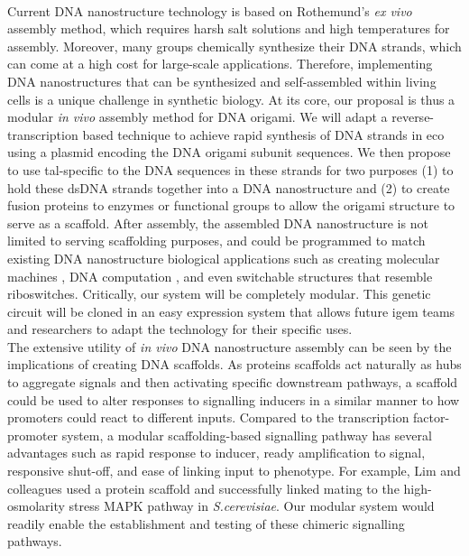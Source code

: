 \documentclass[a4paper]{article}
\begin{document}
\\
Current DNA nanostructure technology is based on Rothemund’s \textit{ex vivo} assembly method, which requires harsh salt solutions and high temperatures for assembly\cite{intro4}.
Moreover, many groups chemically synthesize their DNA strands, which can come at a high cost for large-scale applications.
Therefore, implementing DNA nanostructures that can be synthesized and self-assembled within living cells is a unique challenge in synthetic biology.
At its core, our proposal is thus a modular \textit{in vivo} assembly method for DNA origami.
We will adapt a reverse-transcription based technique to achieve rapid synthesis of DNA strands in \ac{eco} using a plasmid encoding the DNA origami subunit sequences\cite{intro5}.
We then propose to use \ac{tal}-specific to the DNA sequences in these strands for two purposes (1) to hold these dsDNA strands together into a DNA nanostructure and (2) to create fusion proteins to enzymes or functional groups to allow the origami structure to serve as a scaffold.
After assembly, the assembled DNA nanostructure is not limited to serving scaffolding purposes, and could be programmed to match existing DNA nanostructure biological applications such as creating molecular machines \cite{intro6,intro7}, DNA computation \cite{intro8}, and even switchable structures that resemble riboswitches\cite{intro9}.
Critically, our system will be completely modular.
This genetic circuit will be cloned in an easy expression system that allows future \ac{igem} teams and researchers to adapt the technology for their specific uses.
\vspace{2 mm}
\\
The extensive utility of \textit{in vivo} DNA nanostructure assembly can be seen by the implications of creating DNA scaffolds.
As proteins scaffolds act naturally as hubs to aggregate signals and then activating specific downstream pathways, a scaffold could be used to alter responses to signalling inducers in a similar manner to how promoters could react to different inputs\cite{intro11}.
Compared to the transcription factor-promoter system, a modular scaffolding-based signalling pathway has several advantages such as rapid response to inducer, ready amplification to signal, responsive shut-off, and ease of linking input to phenotype.
For example, Lim and colleagues used a protein scaffold and successfully linked mating to the high-osmolarity stress MAPK pathway in \textit{S.cerevisiae}\cite{intro12}.
Our modular system would readily enable the establishment and testing of these chimeric signalling pathways.
\end{document}
